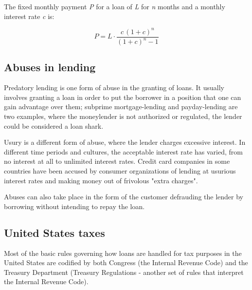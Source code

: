 The fixed monthly payment \textit{P} for a loan of \textit{L} for \textit{n} months and a
monthly interest rate \textit{c} is:



$$P = L \cdot \frac{c\,(1 + c)^n}{(1 + c)^n - 1}$$




\subsection{Abuses in lending}
\label{sss:abus-0dcc}




Predatory lending is one form of abuse in the granting of loans. It usually involves
granting a loan in order to put the borrower in a position that one can gain advantage
over them; subprime mortgage-lending and payday-lending are two examples, where the
moneylender is not authorized or regulated, the lender could be considered a loan shark.



Usury is a different form of abuse, where the lender charges excessive interest. In
different time periods and cultures, the acceptable interest rate has varied, from no
interest at all to unlimited interest rates. Credit card companies in some countries have
been accused by consumer organizations of lending at usurious interest rates and making
money out of frivolous "extra charges".



Abuses can also take place in the form of the customer defrauding the lender by borrowing
without intending to repay the loan.




\subsection{United States taxes}
\label{sss:unit-32b3}




Most of the basic rules governing how loans are handled for tax purposes in the United
States are codified by both Congress (the Internal Revenue Code) and the Treasury
Department (Treasury Regulations - another set of rules that interpret the Internal
Revenue Code).



